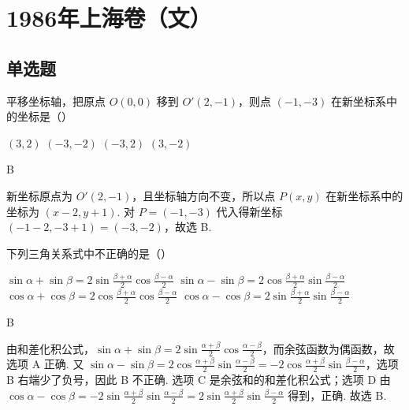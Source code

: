 \chapter{1986年上海卷（文）}

\section{单选题}

\begin{problem}

平移坐标轴，把原点 \(O(0,0)\) 移到 \(O'(2,-1)\)，则点 \((-1,-3)\) 在新坐标系中的坐标是（\quad）

\choices
    {\(\left( 3,2 \right)\)}
    {\(\left( -3,-2 \right)\)}
    {\(\left( -3,2 \right)\)}
    {\(\left( 3,-2 \right)\)}
\end{problem}

\begin{answer}
B
\end{answer}

\begin{solution}
新坐标原点为 \(O'(2,-1)\)，且坐标轴方向不变，所以点 \(P(x,y)\) 在新坐标系中的坐标为 \((x-2,y+1)\). 对 \(P=(-1,-3)\) 代入得新坐标 \((-1-2,-3+1)=(-3,-2)\)，故选 B.
\end{solution}

\begin{problem}

下列三角关系式中不正确的是（\quad）

\choices
    {\(\sin\alpha+\sin\beta=2\sin\frac{\beta+\alpha}{2}\cos\frac{\beta-\alpha}{2} \)}
    {\(\sin\alpha-\sin\beta=2\cos\frac{\beta+\alpha}{2}\sin\frac{\beta-\alpha}{2} \)}
    {\(\cos \alpha + \cos \beta = 2\cos \frac{\beta + \alpha}{2}\cos \frac{\beta - \alpha}{2}\)}
    {\(\cos \alpha - \cos \beta = 2\sin \frac{\beta + \alpha}{2}\sin \frac{\beta - \alpha}{2}\)}
\end{problem}

\begin{answer}
B
\end{answer}

\begin{solution}
由和差化积公式，\(\sin\alpha+\sin\beta=2\sin\frac{\alpha+\beta}{2}\cos\frac{\alpha-\beta}{2}\)，而余弦函数为偶函数，故选项 A 正确. 又 \(\sin\alpha-\sin\beta=2\cos\frac{\alpha+\beta}{2}\sin\frac{\alpha-\beta}{2}=-2\cos\frac{\alpha+\beta}{2}\sin\frac{\beta-\alpha}{2}\)，选项 B 右端少了负号，因此 B 不正确. 选项 C 是余弦和的和差化积公式；选项 D 由 \(\cos\alpha-\cos\beta=-2\sin\frac{\alpha+\beta}{2}\sin\frac{\alpha-\beta}{2}=2\sin\frac{\alpha+\beta}{2}\sin\frac{\beta-\alpha}{2}\) 得到，正确. 故选 B.
\end{solution}

